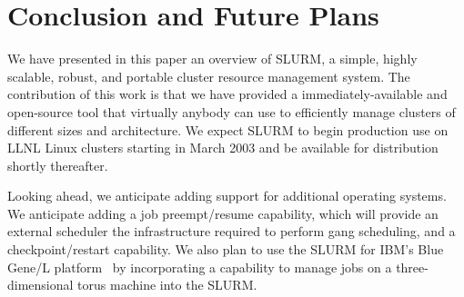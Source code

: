 \section{Conclusion and Future Plans}

We have presented in this paper an overview of SLURM, a simple, highly scalable, robust, 
and portable cluster resource management system.
The contribution of this work is that we have provided a immediately-available
and open-source tool that virtually anybody can use to efficiently manage clusters of 
different sizes and architecture.
We expect SLURM to begin production use on LLNL Linux clusters 
starting in March 2003 and be available for distribution shortly 
thereafter. 

Looking ahead, we anticipate adding support for additional 
operating systems.
We anticipate adding a job preempt/resume capability, which will 
provide an external scheduler the infrastructure 
required to perform gang scheduling, and a checkpoint/restart capability.
We also plan to use the SLURM for IBM's Blue Gene/L platform~\cite{BGL} by incorporating a capability
to manage jobs on a three-dimensional torus machine into the SLURM.
